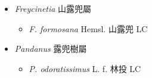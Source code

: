 
  \begin{itemize}
 \item[] \textit{Freycinetia} 山露兜屬
                                
  \begin{itemize}
        \item[] \textit{F. formosana} Hemsl.  山露兜   LC
  \end{itemize}
 \item[] \textit{Pandanus} 露兜樹屬
                                
  \begin{itemize}
        \item[] \textit{P. odoratissimus} L. f.  林投   LC
  \end{itemize}
  \end{itemize}
